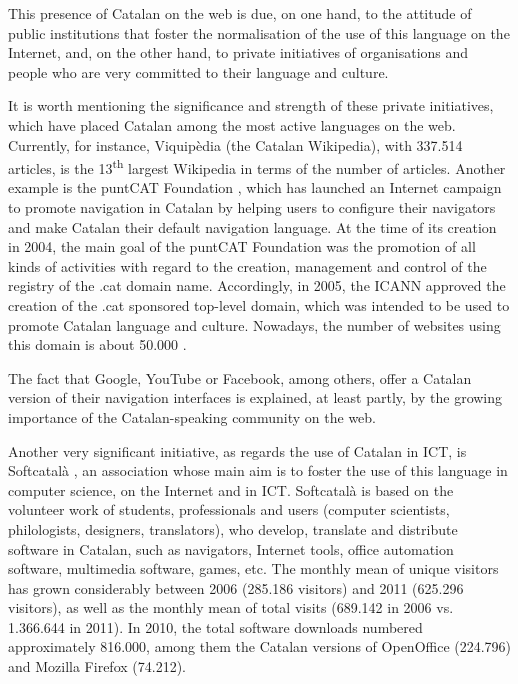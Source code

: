 \begin{multicols}{2}
This presence of Catalan on the web is due, on one hand, to the attitude of public institutions that foster the normalisation of the use of this language on the Internet, and, on the other hand, to private initiatives of organisations and people who are very committed to their language and culture.

It is worth mentioning the significance and strength of these private initiatives, which have placed Catalan among the most active languages on the web. Currently, for instance, Viquipèdia (the Catalan Wikipedia), with 337.514 articles, is the 13\textsuperscript{th} largest Wikipedia in terms of the number of articles. Another example is the puntCAT Foundation \cite{CAT-Nota19}, which has launched an Internet campaign to promote navigation in Catalan by helping users to configure their navigators and make Catalan their default navigation language. At the time of its creation in 2004, the main goal of the puntCAT Foundation was the promotion of all kinds of activities with regard to the creation, management and control of the registry of the .cat domain name. Accordingly, in 2005, the ICANN approved the creation of the .cat sponsored top-level domain, which was intended to be used to promote Catalan language and culture. Nowadays, the number of websites using this domain is about 50.000 \cite{CAT-Nota20}.


The fact that Google, YouTube or Facebook, among others, offer a Catalan version of their navigation interfaces is explained, at least partly, by the growing importance of the Catalan-speaking community on the web.

Another very significant initiative, as regards the use of Catalan in ICT, is Softcatalà \cite{CAT-Nota21}, an association whose main aim is to foster the use of this language in computer science, on the Internet and in ICT. Softcatalà is based on the volunteer work of students, professionals and users (computer scientists, philologists, designers, translators), who develop, translate and distribute software in Catalan, such as navigators, Internet tools, office automation software, multimedia software, games, etc. The monthly mean of unique visitors has grown considerably between 2006 (285.186 visitors) and 2011 (625.296 visitors), as well as the monthly mean of total visits (689.142 in 2006 vs. 1.366.644 in 2011). In 2010, the total software downloads numbered approximately 816.000, among them the Catalan versions of OpenOffice (224.796) and Mozilla Firefox (74.212).


\end{multicols}
